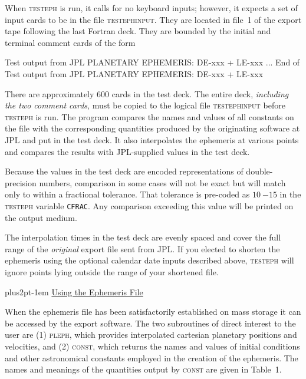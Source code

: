 \documentclass[twoside,11pt,nolof]{starlink}
\providecommand{\hdg}[1]{\vskip4pt plus2pt\leavevmode\kern-1em \underline{\large{#1}}\par}
\begin{document}
When \textsc{testeph} is run, it calls for no keyboard inputs; however,
it expects a set of input cards to be in the file \textsc{testephinput}.
They are located in file~1 of the export tape following the last
Fortran deck. They are bounded by the initial and terminal
comment cards of the form
\begin{terminalv}
        Test output from JPL PLANETARY EPHEMERIS: DE-xxx + LE-xxx
        ...
        End of Test output from JPL PLANETARY EPHEMERIS: DE-xxx + LE-xxx
\end{terminalv}

There are approximately 600 cards in the test deck. The entire deck, \textit{including the two comment cards}, must be copied to the  logical file
\textsc{testephinput} before \textsc{testeph} is run. The program compares
the names and values of all constants on the file with the
corresponding quantities produced by the originating software at
JPL and put in the test deck. It also interpolates the ephemeris
at various points and compares the results with JPL-supplied values
in the test deck.

Because the values in the test deck are encoded representations of
double-precision numbers, comparison in some cases will
not be exact but will match only to within a fractional tolerance.
That tolerance
is pre-coded as $10~{-15}$ in the \textsc{testeph} variable
\texttt{CFRAC}. Any comparison exceeding this value will be
printed on the output medium.

The interpolation times in the test deck are evenly spaced
and cover the full range of the \textit{original\/} export file sent from JPL.
If you elected to shorten the ephemeris using the optional calendar
date inputs described above, \textsc{testeph}
will ignore points lying outside
the range of your shortened file.

\hdg{Using the Ephemeris File}

When the ephemeris file has been satisfactorily established
on mass storage it can be accessed by the export software.
The two subroutines of direct interest to the user are
(1) \textsc{pleph}, which provides interpolated
cartesian planetary positions and
velocities, and (2) \textsc{const}, which returns the
names and values of initial conditions and other astronomical
constants employed in the creation of the ephemeris. The
names and meanings of the quantities output by \textsc{const}
are given in Table~1.
\end{document}

